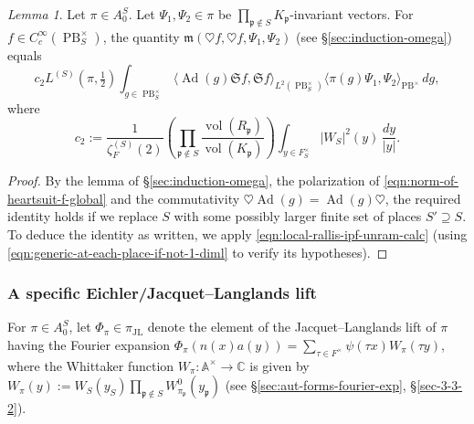\documentclass[reqno,10pt]{amsart}
\theoremstyle{plain} %
\theoremstyle{definition}
\theoremstyle{plain} %
\theoremstyle{remark}
\theoremstyle{itplain} %
\newtheorem*{lemma*}{Lemma}
\theoremstyle{remark} %
\numberwithin{equation}{section}
\DeclareMathOperator{\Ad}{Ad}
\DeclareMathOperator{\JL}{JL}
\def\PB{\operatorname{PB}}
\DeclareMathOperator{\vol}{vol}
\begin{document}
\begin{lemma*}\label{lem:main-term-eval-for-heartsuit}
  Let $\pi \in A_0^S$.  Let $\Psi_1,\Psi_2 \in \pi$ be $\prod_{\mathfrak{p} \notin S} K_\mathfrak{p}$-invariant vectors.  For $f \in C_c^\infty(\PB^\times_S)$, the quantity $\mathfrak{m}(\heartsuit f, \heartsuit f, \Psi_1, \Psi_2)$ (see \S\ref{sec:induction-omega}) equals
  \[
    c_2 L^{(S)}(\pi,\tfrac{1}{2}) \int_{g \in \PB_S^\times} \langle \Ad(g) \mathfrak{S} f, \mathfrak{S} f \rangle_{L^2(\PB_S^\times)} \langle \pi(g) \Psi_1, \Psi_2 \rangle_{\PB^\times} \,d g,
  \]
  where
  \begin{equation}\label{eq:defn-c2-frak-W}
    c_2
    := 
    \frac{1}{\zeta^{(S)}_F(2)}
    \left(\prod_{\mathfrak{p} \notin S}
    \frac{\vol(R_\mathfrak{p})}{\vol(K_\mathfrak{p})}\right)
    \int_{y \in F_S^\times}
    |W_S|^2(y)
    \, \frac{d y}{|y|}.
  \end{equation}
\end{lemma*}
\begin{proof}
  By the lemma of \S\ref{sec:induction-omega}, the polarization of \eqref{eqn:norm-of-heartsuit-f-global} and the commutativity $\heartsuit \Ad(g) = \Ad(g) \heartsuit$, the required identity holds if we replace $S$ with some possibly larger finite set of places $S' \supseteq S$.  To deduce the identity as written, we apply \eqref{eqn:local-rallis-ipf-unram-calc} (using \eqref{eqn:generic-at-each-place-if-not-1-diml} to verify its hypotheses).
\end{proof}


\subsubsection{A specific Eichler/Jacquet--Langlands lift}\label{sec:Phi-pi}
For $\pi \in A_0^S$, let $\Phi_\pi \in \pi_{\JL}$ denote the element of the Jacquet--Langlands lift of $\pi$ having the Fourier expansion $\Phi_\pi(n(x) a(y)) = \sum_{\tau \in F^\times} \psi(\tau x) W_\pi(\tau y)$, where the Whittaker function $W_\pi : \mathbb{A}^\times \rightarrow \mathbb{C}$ is given by $W_\pi(y) := W_S(y_S) \prod_{\mathfrak{p} \notin S} W_{\pi_\mathfrak{p}}^0(y_\mathfrak{p})$ (see \S\ref{sec:aut-forms-fourier-exp}, \S\ref{sec-3-3-2}).
\end{document}
